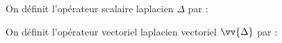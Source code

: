 \documentclass[a4paper]{article}
\begin{document}
On définit l'opérateur scalaire laplacien \(\Delta\) par :\begin{center}\end{center}
On définit l'opérateur vectoriel laplacien vectoriel \(\vv{\Delta}\) par :\begin{center}\end{center}
\end{document}
